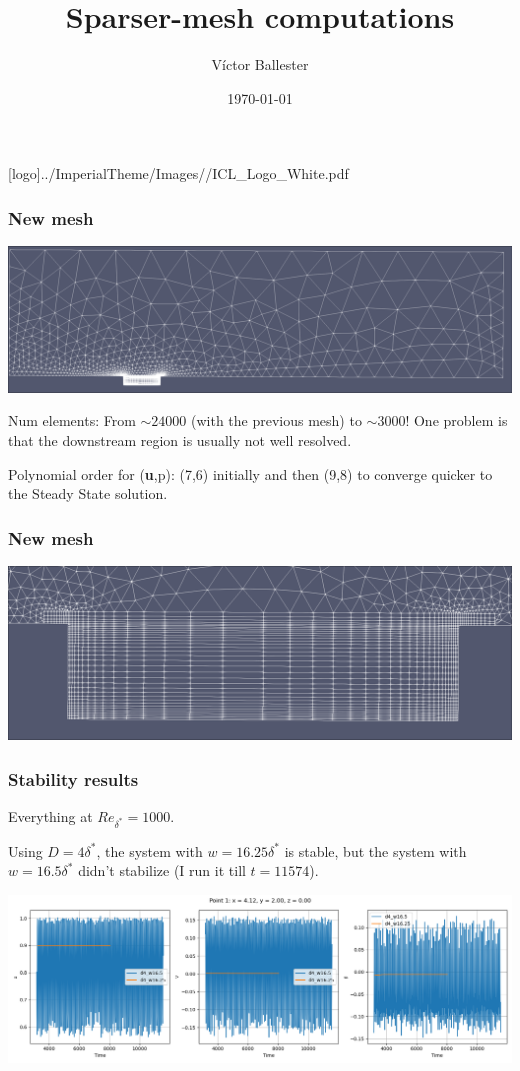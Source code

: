 \documentclass[
	aspectratio=169, %
	t, %
	onlytextwidth, %
	10pt, %
]{beamer}
\title{Sparser-mesh computations} %
\subtitle{} %
\author{Víctor Ballester} %
\date{\today} %
\def\imagefolder{../ImperialTheme/Images/}
\begin{document}
\begingroup
{} %
[logo]{\imagefolder/ICL_Logo_White.pdf} %
\frame[plain, s]{\titlepage} %
\endgroup

\begin{frame}
	\frametitle{New mesh}
	{
		\centering
	  \includegraphics[width=\linewidth]{Images/mesh.png}
  }


  Num elements:  From $\sim24000$ (with the previous mesh) to $\sim3000$!
	One problem is that the downstream region is usually not well resolved.

	Polynomial order for (\textbf{u},p): (7,6) initially and then (9,8) to converge quicker to the Steady State solution.
\end{frame}
\begin{frame}
	\frametitle{New mesh}
	 \centering
	 \includegraphics[width=\linewidth]{Images/meshGap.png}
	
\end{frame}
\begin{frame}
	\frametitle{Stability results}
	Everything at $Re_{\delta^*}=1000$.

	Using $D=4\delta^*$, the system with $w=16.25\delta^*$ is stable, but the system with $w=16.5\delta^*$ didn't stabilize (I run it till $t=11574$).

	{
		\centering
		\includegraphics[width=\linewidth]{Images/evolutionU_16.25_16.5.png}
	}

\end{frame}
\end{document}
